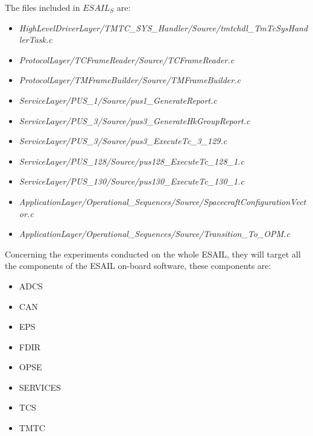 \STARTCHANGEDNOV
The files included in $\mathit{ESAIL}_S$ are:
\begin{itemize}
\item \emph{HighLevelDriverLayer/TMTC\_SYS\_Handler/Source/tmtchdl\_TmTcSysHandlerTask.c}
\item \emph{ProtocolLayer/TCFrameReader/Source/TCFrameReader.c}
\item \emph{ProtocolLayer/TMFrameBuilder/Source/TMFrameBuilder.c}
\item \emph{ServiceLayer/PUS\_1/Source/pus1\_GenerateReport.c}
\item \emph{ServiceLayer/PUS\_3/Source/pus3\_GenerateHkGroupReport.c}
\item \emph{ServiceLayer/PUS\_3/Source/pus3\_ExecuteTc\_3\_129.c}
\item \emph{ServiceLayer/PUS\_128/Source/pus128\_ExecuteTc\_128\_1.c}
\item \emph{ServiceLayer/PUS\_130/Source/pus130\_ExecuteTc\_130\_1.c}
\item \emph{ApplicationLayer/Operational\_Sequences/Source/SpacecraftConfigurationVector.c}
\item \emph{ApplicationLayer/Operational\_Sequences/Source/Transition\_To\_OPM.c}
\end{itemize}
\ENDCHANGEDNOV

Concerning the experiments conducted on the whole ESAIL, they will target all the components of the ESAIL on-board software, these components are:

\begin{itemize}
	\item ADCS
	\item CAN
	\item EPS
	\item FDIR
	\item OPSE
	\item SERVICES
	\item TCS
	\item TMTC
\end{itemize}



